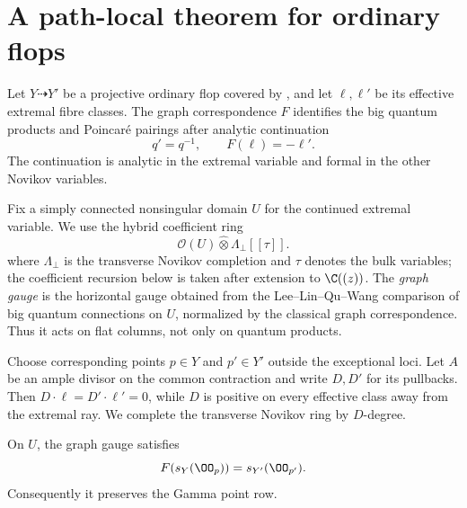 \section{A path-local theorem for ordinary flops}
\label{sec:ordinary-flop}

Let \(Y\dashrightarrow Y'\) be a projective ordinary flop covered by
\cite{LeeLinQuWang}, and let \(\ell,\ell'\) be its effective extremal fibre
classes.  The graph correspondence \(F\) identifies the big quantum products
and Poincar\'e pairings after analytic continuation
\begin{equation}\label{eq:flop-novikov-inversion}
 q'=q^{-1},\qquad F(\ell)=-\ell'.
\end{equation}
The continuation is analytic in the extremal variable and formal in the
other Novikov variables.

Fix a simply connected nonsingular domain \(U\) for the continued extremal
variable.  We use the hybrid coefficient ring
\begin{equation}\label{eq:flop-coefficient-ring}
 \mathcal O(U)\widehat\otimes\Lambda_{\perp}[[\tau]].
\end{equation}
where \(\Lambda_{\perp}\) is the transverse Novikov completion and \(\tau\)
denotes the bulk variables; the coefficient recursion below is taken after
extension to \(\C((z))\).  The \emph{graph gauge} is the horizontal gauge
obtained from the Lee--Lin--Qu--Wang comparison of big quantum connections on
\(U\), normalized by the classical graph correspondence.  Thus it acts on
flat columns, not only on quantum products.

Choose corresponding points \(p\in Y\) and \(p'\in Y'\) outside the
exceptional loci.  Let \(A\) be an ample divisor on the common contraction
and write \(D,D'\) for its pullbacks.  Then
\(D\cdot\ell=D'\cdot\ell'=0\), while \(D\) is positive on every effective
class away from the extremal ray.  We complete the transverse Novikov ring
by \(D\)-degree.

\begin{theorem}
\label{thm:ordinary-flop-point-row}
On \(U\), the graph gauge satisfies
\begin{equation}\label{eq:flop-point-section}
 F(s_Y(\OO_p))=s_{Y'}(\OO_{p'}).
\end{equation}
Consequently it preserves the Gamma point row.
\end{theorem}

